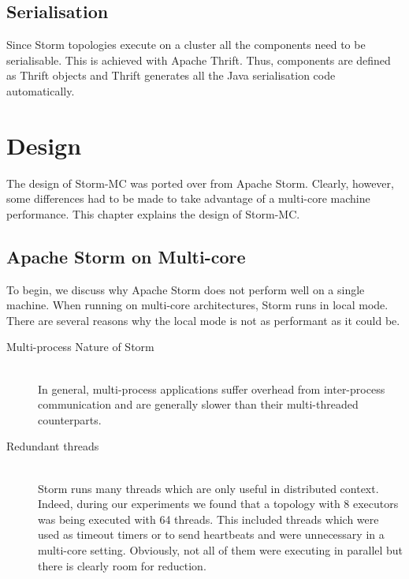 \documentclass[bsc,logo,frontabs,twoside,singlespacing,normalheadings,parskip]{infthesis}     %
\begin{document}
\section{Serialisation}

Since Storm topologies execute on a cluster all the components need to be serialisable. This is achieved with Apache Thrift. Thus, components are defined as Thrift objects and Thrift generates all the Java serialisation code automatically.




\chapter{Design}

The design of Storm-MC was ported over from Apache Storm. Clearly, however, some differences had to be made to take advantage of a multi-core machine performance. This chapter explains the design of Storm-MC.

\section{Apache Storm on Multi-core}

To begin, we discuss why Apache Storm does not perform well on a single machine. When running on multi-core architectures, Storm runs in local mode. There are several reasons why the local mode is not as performant as it could be.

\begin{description}
	\item[Multi-process Nature of Storm] \hfill \\
	In general, multi-process applications suffer overhead from inter-process communication and are generally slower than their multi-threaded counterparts\cite{gluck_optimization_????}.
	\item[Redundant threads] \hfill \\
	Storm runs many threads which are only useful in distributed context. Indeed, during our experiments we found that a topology with 8 executors was being executed with 64 threads. This included threads which were used as timeout timers or to send heartbeats and were unnecessary in a multi-core setting. Obviously, not all of them were executing in parallel but there is clearly room for reduction.
\end{description}
\end{document}
